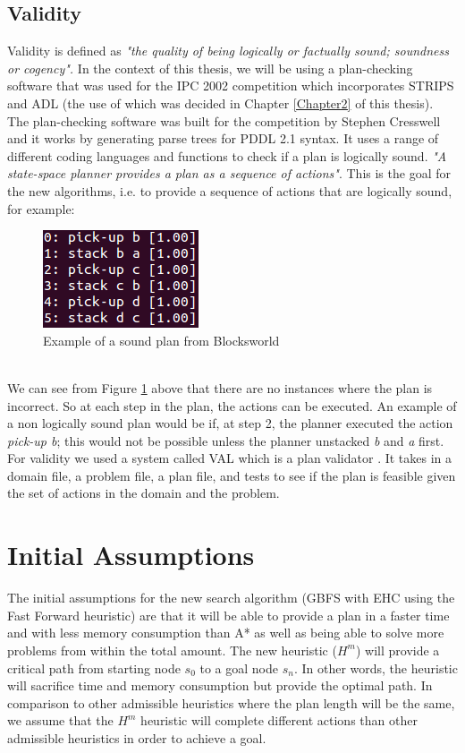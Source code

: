 \subsection{Validity}
Validity is defined as \textit{"the quality of being logically or factually sound; soundness or cogency".} \cite{ValidityDef} In the context of this thesis, we will be using a plan-checking software that was used for the IPC 2002 competition\cite{ICAPS2002} which incorporates STRIPS and ADL (the use of which was decided in Chapter \ref{Chapter2} of this thesis). The plan-checking software was built for the competition by Stephen Cresswell and it works by generating parse trees for PDDL 2.1 syntax. It uses a range of different coding languages and functions to check if a plan is logically sound.
\textit{"A state-space planner provides a plan as a sequence of actions"}\cite{PlanningBook}. This is the goal for the new algorithms, i.e. to provide a sequence of actions that are logically sound, for example:
\\
\begin{figure}[!htb]
    \centering
    \includegraphics[scale=1]{SoundPlan.png}
    \caption{Example of a sound plan from Blocksworld}
    \label{fig:SoundPlan}
\end{figure}
\\
We can see from Figure \ref{fig:SoundPlan} above that there are no instances where the plan is incorrect. So at each step in the plan, the actions can be executed. An example of a non logically sound plan would be if, at step 2, the planner executed the action \textit{pick-up b}; this would not be possible unless the planner unstacked \textit{b} and \textit{a} first. 
\\
For validity we used a system called VAL which is a plan validator \cite{VAL}. It takes in a domain file, a problem file, a plan file, and tests to see if the plan is feasible given the set of actions in the domain and the problem.  
\section{Initial Assumptions}
The initial assumptions for the new search algorithm (GBFS with EHC using the Fast Forward heuristic) are that it will be able to provide a plan in a faster time and with less memory consumption than A* as well as being able to solve more problems from within the total amount. 
The new heuristic ($H^m$) will provide a critical path from starting node $s_0$ to a goal node $s_n$. In other words, the heuristic will sacrifice time and memory consumption but provide the optimal path. In comparison to other admissible heuristics where the plan length will be the same, we assume that the $H^m$ heuristic will complete different actions than other admissible heuristics in order to achieve a goal. 
